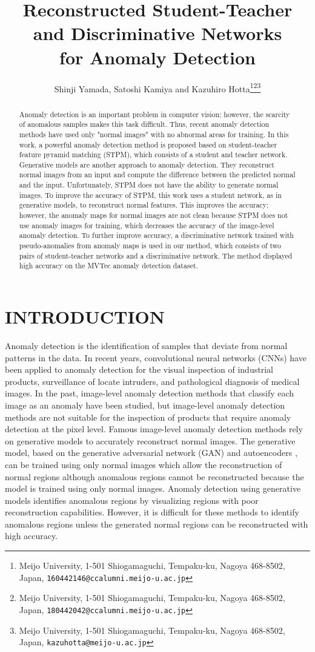 \documentclass[letterpaper, 10 pt, conference]{ieeeconf}
\title{\LARGE \bf
Reconstructed Student-Teacher and Discriminative Networks \\for Anomaly Detection 
}
\author{Shinji Yamada, Satoshi Kamiya and Kazuhiro Hotta\thanks{Meijo University, 1-501 Shiogamaguchi, Tempaku-ku, Nagoya 468-8502, Japan,
        {\tt\small  160442146@ccalumni.meijo-u.ac.jp}}\thanks{Meijo University, 1-501 Shiogamaguchi, Tempaku-ku, Nagoya 468-8502, Japan,
        {\tt\small  180442042@ccalumni.meijo-u.ac.jp}}\thanks{Meijo University, 1-501 Shiogamaguchi, Tempaku-ku, Nagoya 468-8502, Japan,
        {\tt\small  kazuhotta@meijo-u.ac.jp}}}
\begin{document}
\maketitle
\thispagestyle{empty}
\pagestyle{empty}



\begin{abstract}
Anomaly detection is an important problem in computer vision; however, the scarcity of 
 anomalous samples makes this task difficult. Thus, recent anomaly detection methods have used only "normal images" with no abnormal areas for training. In this work, a powerful anomaly detection method is proposed based on student-teacher feature pyramid matching (STPM), which consists of a student and teacher network. Generative models are another approach to anomaly detection. They reconstruct normal images from an input and compute the difference between the predicted normal and the input. Unfortunately, STPM does not have the ability to generate normal images. To improve the accuracy of STPM, this work uses a student network, as in generative models, to reconstruct normal features. This improves the accuracy; however, the anomaly maps for normal images are not clean because STPM does not use anomaly images for training, which decreases the accuracy of the image-level anomaly detection. To further improve accuracy, a discriminative network trained with pseudo-anomalies from anomaly maps is used in our method, which consists of two pairs of student-teacher networks and a discriminative network. The method displayed high accuracy on the MVTec anomaly detection dataset.
\end{abstract}


\section{INTRODUCTION}

Anomaly detection is the identification of samples that deviate from normal patterns in the data. In recent years, convolutional neural networks (CNNs) have been applied to anomaly detection for the visual inspection of industrial products\cite{c2, c3, c4}, surveillance of locate intruders\cite{c5,c6,c7}, and pathological diagnosis of medical images\cite{c8, c9, c10, c11, c12}. In the past, image-level anomaly detection methods that classify each image as an anomaly have been studied, but image-level anomaly detection methods are not suitable for the inspection of products that require anomaly detection at the pixel level. Famous image-level anomaly detection methods rely on generative models to accurately reconstruct normal images. The generative model, based on the generative adversarial network (GAN)\cite{c11} and autoencoders \cite{c13}, can be trained using only normal images which allow the reconstruction of normal regions although anomalous regions cannot be reconstructed because the model is trained using only normal images. Anomaly detection using generative models identifies anomalous regions by visualizing regions with poor reconstruction capabilities. However, it is difficult for these methods to identify anomalous regions unless the generated normal regions can be reconstructed with high accuracy\cite{c15,c13}.
\end{document}
